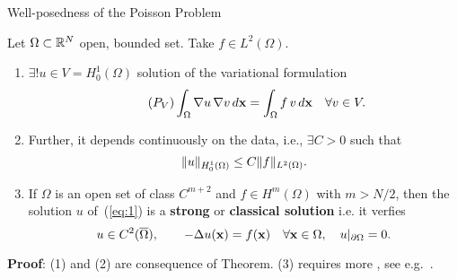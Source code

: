 \begin{frame}{Well-posedness of the Poisson Problem}
  \begin{theorem}
    Let $\Omega \subset \Rset^N$ open, bounded set. Take $f\in L^2(\Omega)$.
    \begin{enumerate}
    \item \alert{$\exists! u \in V=H_0^1(\Omega)$ solution} of the variational formulation
      \begin{equation}
        \tag{\ensuremath{P_V}}
        \int_\Omega \grad u \, \grad v \,d\xx = \int_\Omega f\, v \, d\xx \quad \forall v\in V.
        \label{eq:1}
      \end{equation}
    \item Further, it \alert{depends continuously on the data}, i.e., $\exists C>0$ such that
      $$
      \norm[H_0^1(\Omega)]{u} \le C \norm[L^2(\Omega)]{f}.
      $$
    \item If $\Omega$ is an open set of class $C^{m+2}$ and
      $f\in H^m(\Omega)$ with $m>N/2$, then the solution $u$
      of~(\ref{eq:1}) is a \alert{\textbf{strong} or \textbf{classical solution}} i.e. it verfies
      $$
      u\in C^2(\overline\Omega), \qquad -\Delta u(\xx) = f(\xx) \quad \forall \xx\in\Omega, \quad u|_{\partial\Omega}=0.
      $$
    \end{enumerate}
  \end{theorem}
  \scriptsize \textbf{Proof}: (1) and (2) are consequence of
   Theorem. (3) requires more , see e.g.~\cite{brezis:2017,allaire:2007}.
\end{frame}

